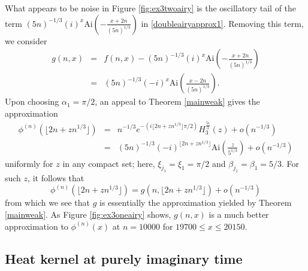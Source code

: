 \documentclass{article}
\theoremstyle{theorem}
\theoremstyle{remark}
\begin{document}
\break

\noindent What appears to be noise in Figure \ref{fig:ex3twoairy} is the oscillatory tail of the term \break $(5n)^{-1/3}(i)^x\mbox{Ai}\left(-\frac{x+2n}{(5n)^{1/3}}\right)$ in \eqref{doubleairyapprox1}. Removing this term, we consider
\begin{eqnarray*}
 g(n,x)&=&f(n,x)-(5n)^{-1/3}(i)^x\mbox{Ai}\left(-\frac{x+2n}{(5n)^{1/3}}\right)\\
&=&(5n)^{-1/3}(-i)^x\mbox{Ai}\left(\frac{x-2n}{(5n)^{1/3}}\right).
\end{eqnarray*}
Upon choosing $\alpha_1=\pi/2$, an appeal to Theorem \ref{mainweak} gives the approximation
\begin{eqnarray*}
\phi^{(n)}(\lfloor 2n+zn^{1/3}\rfloor)&=&n^{-1/3}e^{-(i\lfloor 2n+zn^{1/3}\rfloor \pi/2)}H_3^{\frac{5i}{3}}(z)+o(n^{-1/3})\\
&=&(5n)^{-1/3}(-i)^{\lfloor2n+zn^{1/3}\rfloor}\mbox{Ai}\left(\frac{z}{5^{1/3}}\right)+o(n^{-1/3})
\end{eqnarray*}
uniformly for $z$ in any compact set; here, $\xi_{j_1}=\xi_{1}=\pi/2$ and $\beta_{j_1}=\beta_{1}=5/3$. For such $z$, it follows that
\begin{equation*}
\phi^{(n)}(\lfloor 2n+zn^{1/3}\rfloor)=g(n,\lfloor 2n+zn^{1/3}\rfloor)+o(n^{-1/3})
\end{equation*}
from which we see that $g$ is essentially the approximation yielded by Theorem \ref{mainweak}. As Figure \ref{fig:ex3oneairy} shows, $g(n,x)$ is a much better approximation to $\phi^{(n)}(x)$ at $n=10000$ for $19700\leq x\leq20150$. 

\subsection{Heat kernel at purely imaginary time}\label{ex1}
\end{document}
